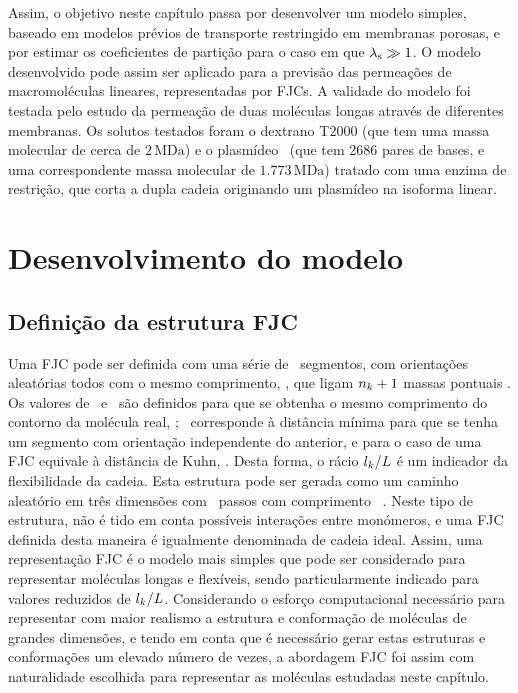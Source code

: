 %
Assim, o objetivo neste capítulo passa por desenvolver um modelo simples, baseado em modelos prévios de transporte restringido em membranas porosas, e por estimar os coeficientes de partição para o caso em que $\lambda_{\mathrm{s}} \gg 1$. O modelo desenvolvido pode assim ser aplicado para a previsão das permeações de macromoléculas lineares, representadas por FJCs. A validade do modelo foi testada pelo estudo da permeação de duas moléculas longas através de diferentes membranas. Os solutos testados foram o dextrano T2000 (que tem uma massa molecular de cerca de $2\,\mathrm{MDa}$) e o plasmídeo \pUC\ (que tem 2686 pares de bases, e uma correspondente massa molecular de $1.773\,\mathrm{MDa}$) tratado com uma enzima de restrição, que corta a dupla cadeia originando um plasmídeo na isoforma linear.
%
% 

\section{Desenvolvimento do modelo}

\subsection{Definição da estrutura FJC}
Uma FJC pode ser definida com uma série de \numsegmento\ segmentos, com orientações aleatórias todos com o mesmo comprimento, \comsegmento, que ligam $n_{k}+1$ massas pontuais \cite{teraoka,tager,youngbook}. Os valores de \numsegmento\ e \comsegmento\ são definidos para que se obtenha o mesmo comprimento do contorno da molécula real, \contorno; \comsegmento\ corresponde à distância mínima para que se tenha um segmento com orientação independente do anterior, e para o caso de uma FJC equivale à distância de Kuhn, \kuhn. 
%
%
%
%
Desta forma, o rácio $l_{k}/L$ é um indicador da flexibilidade da cadeia. Esta estrutura pode ser gerada como um caminho aleatório em três dimensões com \numsegmento\ passos com comprimento \comsegmento\ \cite{teraoka}. Neste tipo de estrutura, não é tido em conta possíveis interações entre monómeros, e uma FJC definida desta maneira é igualmente denominada de cadeia ideal. 
%
Assim, uma representação FJC é o modelo mais simples que pode ser considerado para representar moléculas longas e flexíveis, sendo particularmente indicado para valores reduzidos de $l_{k}/L$. Considerando o esforço computacional necessário para representar com maior realismo a estrutura e conformação de moléculas de grandes dimensões, e tendo em conta que é necessário gerar estas estruturas e conformações um elevado número de vezes, a abordagem FJC foi assim com naturalidade escolhida para representar as moléculas estudadas neste capítulo.

